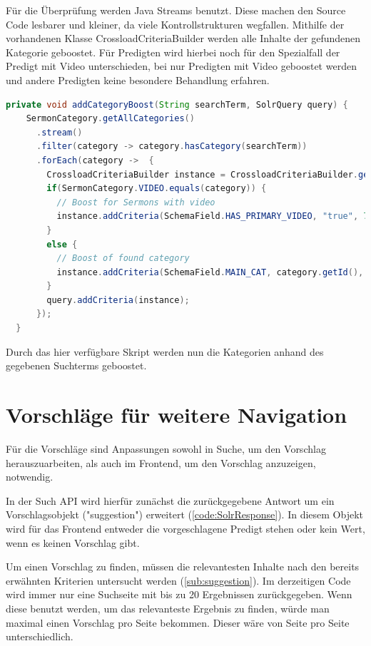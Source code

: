 Für die Überprüfung werden Java Streams benutzt.
Diese machen den Source Code lesbarer und kleiner, da viele Kontrollstrukturen wegfallen.
Mithilfe der vorhandenen Klasse CrossloadCriteriaBuilder werden alle Inhalte der gefundenen Kategorie geboostet.
Für Predigten wird hierbei noch für den Spezialfall der Predigt mit Video unterschieden, bei nur Predigten mit Video geboostet werden und andere Predigten keine besondere Behandlung erfahren.

\clearpage
\begin{lstlisting}[language=Java, title={Code für Überprüfung und Boosten der Kategorien. \cite{solr-search2022}}]
  private void addCategoryBoost(String searchTerm, SolrQuery query) {
    SermonCategory.getAllCategories()
      .stream()
      .filter(category -> category.hasCategory(searchTerm))
      .forEach(category ->  {
        CrossloadCriteriaBuilder instance = CrossloadCriteriaBuilder.getInstance();
        if(SermonCategory.VIDEO.equals(category)) {
          // Boost for Sermons with video
          instance.addCriteria(SchemaField.HAS_PRIMARY_VIDEO, "true", 75);
        }
        else {
          // Boost of found category
          instance.addCriteria(SchemaField.MAIN_CAT, category.getId(), 75);
        }
        query.addCriteria(instance);
      });
  }
\end{lstlisting}

Durch das hier verfügbare Skript werden nun die Kategorien anhand des gegebenen Suchterms geboostet.

\section{Vorschläge für weitere Navigation}
\label{sec:devSuggestions}

Für die Vorschläge sind Anpassungen sowohl in Suche, um den Vorschlag herauszuarbeiten, als auch im Frontend, um den Vorschlag anzuzeigen, notwendig.

In der Such API wird hierfür zunächst die zurückgegebene Antwort um ein Vorschlagsobjekt ("suggestion") erweitert (\ref{code:SolrResponse}).
In diesem Objekt wird für das Frontend entweder die vorgeschlagene Predigt stehen oder kein Wert, wenn es keinen Vorschlag gibt.

Um einen Vorschlag zu finden, müssen die relevantesten Inhalte nach den bereits erwähnten Kriterien untersucht werden (\ref{sub:suggestion}).
Im derzeitigen Code wird immer nur eine Suchseite mit bis zu 20 Ergebnissen zurückgegeben.
Wenn diese benutzt werden, um das relevanteste Ergebnis zu finden, würde man maximal einen Vorschlag pro Seite bekommen.
Dieser wäre von Seite pro Seite unterschiedlich.


